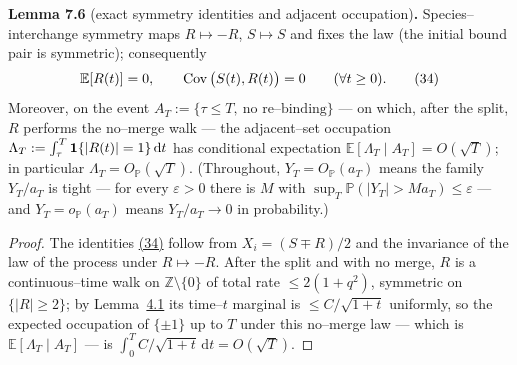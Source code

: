 \documentclass[11pt]{article}
\theoremstyle{plain}
\theoremstyle{definition}
\theoremstyle{remark}
\newcommand{\Z}{\mathbb{Z}}\newcommand{\R}{\mathbb{R}}\newcommand{\N}{\mathbb{N}}
\newcommand{\E}{\mathbb{E}}\newcommand{\PP}{\mathbb{P}}\newcommand{\dd}{\,\mathrm{d}}
\begin{document}
\label{lem_occ}\noindent\textbf{Lemma 7.6} (exact symmetry identities and adjacent occupation)\textbf{.} 
Species--interchange symmetry maps $R\mapsto-R$, $S\mapsto S$ and fixes the law (the
initial bound pair is symmetric); consequently
\label{eq_symm}
\begin{equation}
  \E[R(t)]=0,\qquad \Cov\big(S(t),R(t)\big)=0\qquad(\forall t\ge0).\qquad(34)
\end{equation}
Moreover, on the event $A_T:=\{\tau\le T,\ \text{no re--binding}\}$ --- on which, after
the split, $R$ performs the no--merge walk --- the adjacent--set occupation
$\Lambda_T:=\int_\tau^T\bone\{|R(t)|=1\}\dd t$ has conditional expectation
$\E[\Lambda_T\mid A_T]=O(\sqrt T)$; in particular $\Lambda_T=O_\PP(\sqrt T)$. (Throughout,
$Y_T=O_\PP(a_T)$ means the family $Y_T/a_T$ is tight --- for every $\varepsilon>0$ there is
$M$ with $\sup_T\PP(|Y_T|>M a_T)\le\varepsilon$ --- and $Y_T=o_\PP(a_T)$ means
$Y_T/a_T\to0$ in probability.)
\par
\begin{proof}
The identities \hyperref[eq_symm]{(34)} follow from $X_i=(S\mp R)/2$ and the invariance of the
law of the process under $R\mapsto-R$. After the split and with no merge, $R$ is a
continuous--time walk on $\Z\setminus\{0\}$ of total rate $\le2(1+q^2)$, symmetric on
$\{|R|\ge2\}$; by Lemma~\hyperref[lem_free]{4.1} its time--$t$ marginal is $\le C/\sqrt{1+t}$
uniformly, so the expected occupation of $\{\pm1\}$ up to $T$ under this no--merge law
--- which is $\E[\Lambda_T\mid A_T]$ --- is $\int_0^T C/\sqrt{1+t}\dd t=O(\sqrt T)$.
\end{proof}
\end{document}
